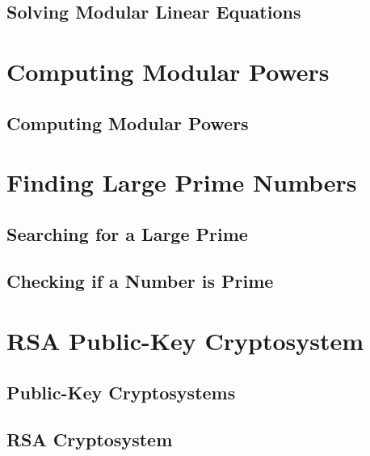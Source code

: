 \documentclass{beamer}
\begin{document}
\subsection{Solving Modular Linear Equations}

\section{Computing Modular Powers}

\subsection{Computing Modular Powers}

\section{Finding Large Prime Numbers}

\subsection{Searching for a Large Prime}

\subsection{Checking if a Number is Prime}

\section{RSA Public-Key Cryptosystem}


\subsection{Public-Key Cryptosystems}

\subsection{RSA Cryptosystem}
\end{document}
